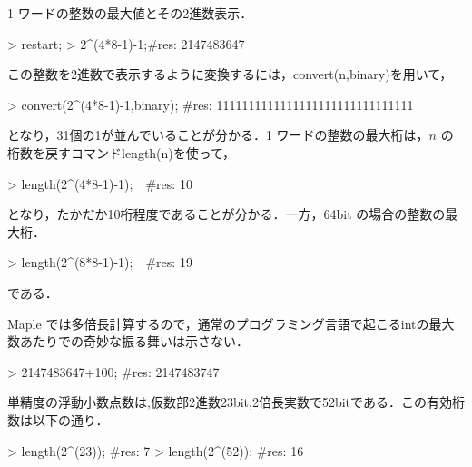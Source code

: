 1 ワードの整数の最大値とその2進数表示．
\begin{MapleInput}
> restart;
> 2^(4*8-1)-1;#res: 2147483647

\end{MapleInput}
この整数を2進数で表示するように変換するには，convert(n,binary)を用いて，
\begin{MapleInput}
> convert(2^(4*8-1)-1,binary);  #res: 1111111111111111111111111111111
\end{MapleInput}
となり，31個の1が並んでいることが分かる．1 ワードの整数の最大桁は，$n$ の桁数を戻すコマンドlength(n)を使って，
\begin{MapleInput}
> length(2^(4*8-1)-1);　#res: 10
\end{MapleInput}
となり，たかだか10桁程度であることが分かる．一方，64bit の場合の整数の最大桁．
\begin{MapleInput}
> length(2^(8*8-1)-1);　#res: 19
\end{MapleInput}
である．
                                    
Maple では多倍長計算するので，通常のプログラミング言語で起こるintの最大数あたりでの奇妙な振る舞いは示さない．

\begin{MapleInput}
> 2147483647+100;  #res: 2147483747
\end{MapleInput}

単精度の浮動小数点数は,仮数部2進数23bit,2倍長実数で52bitである．この有効桁数は以下の通り．
\begin{MapleInput}
> length(2^(23)); #res: 7
> length(2^(52)); #res: 16
\end{MapleInput}
